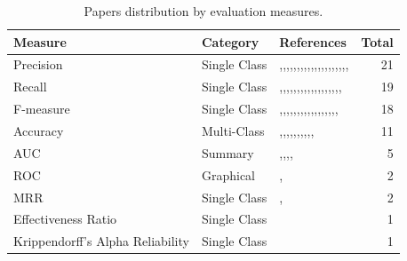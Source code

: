 \begin{table}[h!]
  \centering
  \captionsetup{type=table}\textsl{}
  \caption{Papers distribution by evaluation measures.}
  \begin{tabular}{@{}llp{8cm}r@{}}
    \toprule
    \textbf{Measure} & \textbf{Category} & \textbf{References} & \textbf{Total} \\
    \midrule
    Precision & Single Class & \cite{Lamkanfi:2010},\cite{Tian:2012},\cite{Chaturvedi:2012},\cite{Yang:2014b},\cite{Valdivia:2014},\cite{Meera:2014},\cite{Roy:2014},\cite{Zhang:2015},\cite{Sharma:2015},\cite{Xia:2015},\cite{Gujral:2015},\cite{Pushpalathas:2016},\cite{Sabor:2016},\cite{Zhang:2016},\cite{Jin:2016a},\cite{Choeikiwong:2016},\cite{Jin:2016b},\cite{Jin:2016c},\cite{Yang:2017},\cite{Singh:2017},\cite{Roy:2017} & 21 \\
    \midrule
    Recall & Single Class & \cite{Lamkanfi:2010},\cite{Tian:2012},\cite{Chaturvedi:2012},\cite{Yang:2014b},\cite{Valdivia:2014},\cite{Meera:2014},\cite{Roy:2014},\cite{Zhang:2015},\cite{Xia:2015},\cite{Pushpalathas:2016},\cite{Sabor:2016},\cite{Zhang:2016},\cite{Jin:2016a},\cite{Choeikiwong:2016},\cite{Jin:2016b},\cite{Jin:2016c},\cite{Yang:2017},\cite{Singh:2017},\cite{Roy:2017} & 19 \\
    \midrule
    F-measure & Single Class & \cite{Lamkanfi:2010},\cite{Tian:2012},\cite{Chaturvedi:2012},\cite{Yang:2014b},\cite{Valdivia:2014},\cite{Meera:2014},\cite{Roy:2014},\cite{Zhang:2015},\cite{Xia:2015},\cite{Sabor:2016},\cite{Zhang:2016},\cite{Jin:2016a},\cite{Choeikiwong:2016},\cite{Jin:2016b},\cite{Jin:2016c},\cite{Yang:2017},\cite{Singh:2017},\cite{Roy:2017} & 18 \\
    \midrule
    Accuracy & Multi-Class & \cite{Chaturvedi:2012},\cite{Yang:2014b},\cite{Valdivia:2014},\cite{Meera:2014},\cite{Roy:2014},\cite{Saha:2015},\cite{Sharma:2015},\cite{Gujral:2015},\cite{Pushpalathas:2016},\cite{Otoom:2016},\cite{Singh:2017} & 11 \\
    \midrule
    AUC & Summary & \cite{Lamkanfi:2010},\cite{Lamkanfi:2011},\cite{Yang:2012},\cite{Yang:2014a},\cite{Roy:2014} & 5 \\
    \midrule
    ROC & Graphical & \cite{Lamkanfi:2010},\cite{Roy:2014} & 2 \\
    \midrule
    MRR\footnotemark & Single Class & \cite{Yang:2014b},\cite{Zhang:2016} & 2 \\
    \midrule
    Effectiveness Ratio\footnotemark & Single Class & \cite{Xia:2015} & 1 \\
    \midrule
    Krippendorff's Alpha Reliability\footnotemark & Single Class & \cite{Tian:2016} & 1 \\
    \bottomrule
  \end{tabular}
  \label{tab:evaluation_measures_by_papers}
\end{table}
